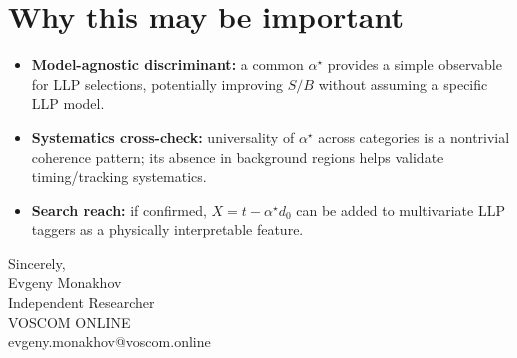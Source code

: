 \documentclass[a4paper,12pt]{article}
\begin{document}
\section*{Why this may be important}
\begin{itemize}
  \item \textbf{Model-agnostic discriminant:} a common $\alpha^\star$ provides a simple observable for LLP selections, potentially improving $S/B$ without assuming a specific LLP model.
  \item \textbf{Systematics cross-check:} universality of $\alpha^\star$ across categories is a nontrivial coherence pattern; its absence in background regions helps validate timing/tracking systematics.
  \item \textbf{Search reach:} if confirmed, $X=t-\alpha^\star d_0$ can be added to multivariate LLP taggers as a physically interpretable feature.
\end{itemize}

\bigskip
Sincerely, \\
Evgeny Monakhov \\
Independent Researcher \\
VOSCOM ONLINE \\
evgeny.monakhov@voscom.online
\end{document}
